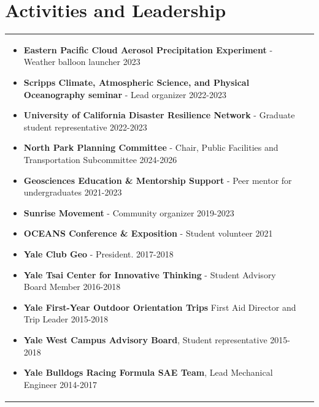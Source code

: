 \documentclass[a4paper,10pt]{article}
\begin{document}
\section{Activities and Leadership}
\begin{tabularx}{\linewidth}{@{}l X@{}}
\begin{minipage}[t]{\linewidth}
    \begin{itemize}[nosep,after=\strut, leftmargin=1em, itemsep=3pt]
        \item[--] \textbf{Eastern Pacific Cloud Aerosol Precipitation Experiment} - Weather balloon launcher \hfill 2023
        \item[--] \textbf{Scripps Climate, Atmospheric Science, and Physical Oceanography seminar} - Lead organizer \hfill 2022-2023
        \item[--] \textbf{University of California Disaster Resilience Network} - Graduate student representative \hfill 2022-2023
        \item[--] \textbf{North Park Planning Committee} - Chair, Public Facilities and Transportation Subcommittee \hfill 2024-2026
        \item[--] \textbf{Geosciences Education \& Mentorship Support} - Peer mentor for undergraduates \hfill 2021-2023
        \item[--] \textbf{Sunrise Movement} - Community organizer \hfill 2019-2023
        \item[--] \textbf{OCEANS Conference \& Exposition} - Student volunteer \hfill 2021
        \item[--] \textbf{Yale Club Geo} - President. \hfill 2017-2018
        \item[--] \textbf{Yale Tsai Center for Innovative Thinking} - Student Advisory Board Member \hfill 2016-2018
        \item[--] \textbf{Yale First-Year Outdoor Orientation Trips} First Aid Director and Trip Leader \hfill 2015-2018
        \item[--] \textbf{Yale West Campus Advisory Board}, Student representative \hfill 2015-2018
        \item[--] \textbf{Yale Bulldogs Racing Formula SAE Team}, Lead Mechanical Engineer \hfill 2014-2017
        
    \end{itemize}
    \end{minipage}
\end{tabularx}

  
\end{document}
